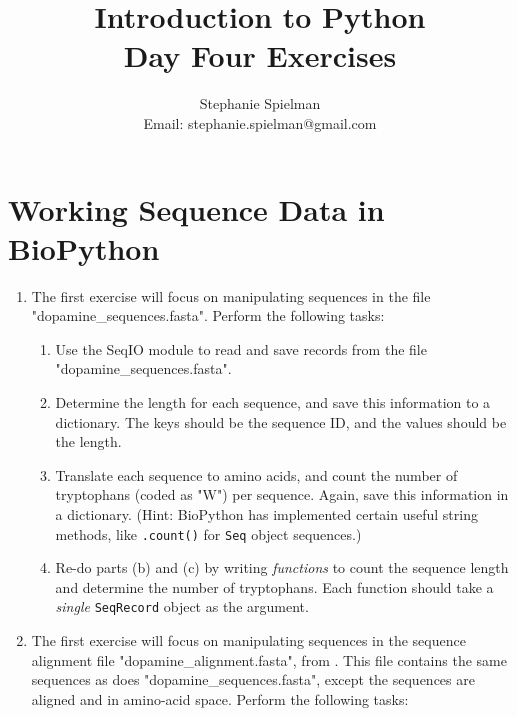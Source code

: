 \documentclass{article}[12pt]
\newcommand{\code}[1]{\texttt{#1}}  %
\begin{document}
\title{Introduction to Python \\ Day Four Exercises}
\author{Stephanie Spielman \\ \footnotesize{Email: stephanie.spielman@gmail.com}}
\date{}
\maketitle{}

\section*{Working Sequence Data in BioPython}


\begin{enumerate}[itemsep=5ex]

	\item The first exercise will focus on manipulating sequences in the file "dopamine\_sequences.fasta". Perform the following tasks:
	
	\begin{enumerate}[itemsep=2ex]
		\item Use the SeqIO module to read and save records from the file "dopamine\_sequences.fasta".
		\item Determine the length for each sequence, and save this information to a dictionary. The keys should be the sequence ID, and the values should be the length.
		\item Translate each sequence to amino acids, and count the number of tryptophans (coded as "W") per sequence. Again, save this information in a dictionary. (Hint: BioPython has implemented certain useful string methods, like \code{.count()} for \code{Seq} object sequences.)
		\item Re-do parts (b) and (c) by writing \emph{functions} to count the sequence length and determine the number of tryptophans. Each function should take a \emph{single} \code{SeqRecord} object as the argument.
		
		
	\end{enumerate}
	
	\item The first exercise will focus on manipulating sequences in the sequence alignment file "dopamine\_alignment.fasta", from \citet{SpielmanKumarWilke2015}. This file contains the same sequences as does "dopamine\_sequences.fasta", except the sequences are aligned and in amino-acid space. Perform the following tasks:
		

\end{enumerate}
\end{document}
